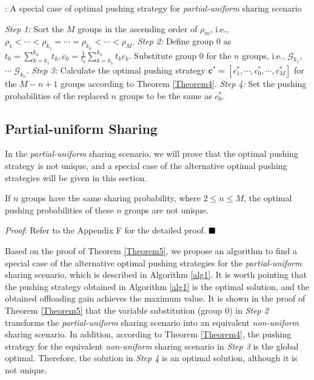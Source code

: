 \documentclass[12pt, draftclsnofoot, onecolumn]{IEEEtran}
\begin{document}
\begin{algorithm}
\caption{: A special case of optimal pushing strategy for \textit{partial-uniform} sharing scenario}  \label{alg1}
\begin{algorithmic}
\STATE
\textit{Step 1:} Sort the $M$ groups in the  ascending order of $\rho_m$, i.e.,  $\rho_1 <\cdots <\rho_{k_1}= \cdots =\rho_{k_n}<\cdots< \rho_M$.
\STATE
\textit{Step 2:} Define group 0 as $t_0 = \sum\limits_{k=k_1}^{k_n} t_k, c_0 =\frac{1}{t_0}\sum\limits_{k=k_1}^{k_n} t_kc_k$.  Substitute group 0 for the $n$ groups, i.e., $\mathcal{G}_{k_1}$, $\cdots$ $\mathcal{G}_{k_n}$.
\STATE
\textit{Step 3:} Calculate the optimal pushing strategy $\bm{c}^{\ast} =[c_1^{\ast},\cdots,c_0^{\ast},\cdots,c_M^{\ast}]$ for the $M-n+1$ groups according to Theorem \ref{Theorem4}.
\STATE
\textit{Step 4:} Set the pushing probabilities of the replaced $n$ groups to be the same as $c_0^{\ast}$.
\end{algorithmic}
\end{algorithm}


\subsection {Partial-uniform Sharing}
In the \textit{partial-uniform} sharing scenario, we will prove that the optimal pushing strategy is not unique, and a special case of the alternative optimal pushing strategies will be given in this section.
\begin{theorem}\label{Theorem5}
If $n$ groups have the same sharing probability, where $2 \leq n \leq M$, the optimal pushing probabilities of these $n$ groups are not unique.
\end{theorem}
\textit{Proof}: Refer to the Appendix F for the detailed proof.
$\hfill\blacksquare$

Based on the proof of Theorem \ref{Theorem5}, we propose an algorithm to find a special case of the alternative optimal pushing strategies for the \textit{partial-uniform} sharing scenario, which is described in Algorithm \ref{alg1}.
It is worth pointing that the pushing strategy obtained in Algorithm \ref{alg1} is the optimal solution, and the obtained offloading gain achieves the maximum value.
It is shown in the proof of  Theorem \ref{Theorem5} that the variable substitution (group 0) in \textit{Step 2} transforms the \textit{partial-uniform} sharing scenario into an equivalent  \textit{non-uniform} sharing scenario.
In addition, according to Theorem \ref{Theorem4}, the pushing strategy for the equivalent  \textit{non-uniform} sharing scenario in \textit{Step 3} is the global optimal.
Therefore, the solution in \textit{Step 4} is an optimal solution, although it is not unique.
\end{document}
